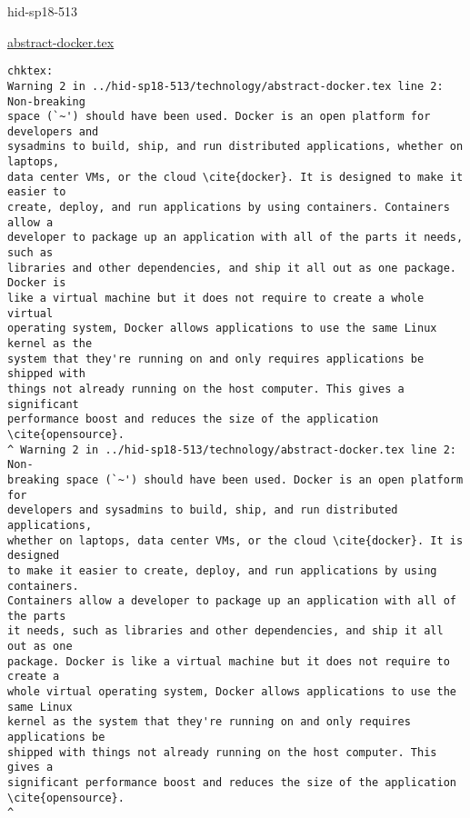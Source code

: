\begin{IU}

hid-sp18-513

\href{https://github.com/cloudmesh-community/hid-sp18-513/blob/master//technology/abstract-docker.tex}{abstract-docker.tex}

\begin{tiny}
\begin{verbatim}
chktex:
Warning 2 in ../hid-sp18-513/technology/abstract-docker.tex line 2: Non-breaking
space (`~') should have been used. Docker is an open platform for developers and
sysadmins to build, ship, and run distributed applications, whether on laptops,
data center VMs, or the cloud \cite{docker}. It is designed to make it easier to
create, deploy, and run applications by using containers. Containers allow a
developer to package up an application with all of the parts it needs, such as
libraries and other dependencies, and ship it all out as one package. Docker is
like a virtual machine but it does not require to create a whole virtual
operating system, Docker allows applications to use the same Linux kernel as the
system that they're running on and only requires applications be shipped with
things not already running on the host computer. This gives a significant
performance boost and reduces the size of the application \cite{opensource}.
^ Warning 2 in ../hid-sp18-513/technology/abstract-docker.tex line 2: Non-
breaking space (`~') should have been used. Docker is an open platform for
developers and sysadmins to build, ship, and run distributed applications,
whether on laptops, data center VMs, or the cloud \cite{docker}. It is designed
to make it easier to create, deploy, and run applications by using containers.
Containers allow a developer to package up an application with all of the parts
it needs, such as libraries and other dependencies, and ship it all out as one
package. Docker is like a virtual machine but it does not require to create a
whole virtual operating system, Docker allows applications to use the same Linux
kernel as the system that they're running on and only requires applications be
shipped with things not already running on the host computer. This gives a
significant performance boost and reduces the size of the application
\cite{opensource}.
^
\end{verbatim}
\end{tiny}
\end{IU}



